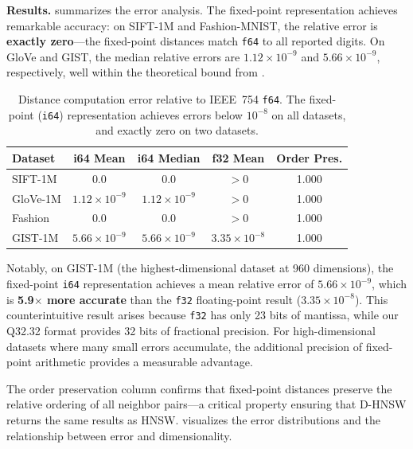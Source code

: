 \documentclass[10pt,journal,compsoc]{IEEEtran}
\newcommand{\dhnsw}{\textsc{D-HNSW}}
\newcommand{\hnsw}{\textsc{HNSW}}
\begin{document}
\textbf{Results.}  summarizes the error analysis. The fixed-point representation achieves remarkable accuracy: on SIFT-1M and Fashion-MNIST, the relative error is \textbf{exactly zero}---the fixed-point distances match \texttt{f64} to all reported digits. On GloVe and GIST, the median relative errors are $1.12 \times 10^{-9}$ and $5.66 \times 10^{-9}$, respectively, well within the theoretical bound from .

\begin{table}[t]
  \centering
  \caption{Distance computation error relative to IEEE~754 \texttt{f64}. The fixed-point (\texttt{i64}) representation achieves errors below $10^{-8}$ on all datasets, and exactly zero on two datasets.}
  \label{tab:error}
  \begin{tabular}{lcccc}
    \toprule
    \textbf{Dataset} & \textbf{i64 Mean} & \textbf{i64 Median} & \textbf{f32 Mean} & \textbf{Order Pres.} \\
    \midrule
    SIFT-1M  & 0.0             & 0.0             & $>0$           & 1.000 \\
    GloVe-1M & $1.12\times10^{-9}$ & $1.12\times10^{-9}$ & $>0$     & 1.000 \\
    Fashion  & 0.0             & 0.0             & $>0$           & 1.000 \\
    GIST-1M  & $5.66\times10^{-9}$ & $5.66\times10^{-9}$ & $3.35\times10^{-8}$ & 1.000 \\
    \bottomrule
  \end{tabular}
\end{table}

Notably, on GIST-1M (the highest-dimensional dataset at 960 dimensions), the fixed-point \texttt{i64} representation achieves a mean relative error of $5.66 \times 10^{-9}$, which is \textbf{5.9$\times$ more accurate} than the \texttt{f32} floating-point result ($3.35 \times 10^{-8}$). This counterintuitive result arises because \texttt{f32} has only 23 bits of mantissa, while our Q32.32 format provides 32 bits of fractional precision. For high-dimensional datasets where many small errors accumulate, the additional precision of fixed-point arithmetic provides a measurable advantage.

The order preservation column confirms that fixed-point distances preserve the relative ordering of all neighbor pairs---a critical property ensuring that \dhnsw{} returns the same results as \hnsw{}.  visualizes the error distributions and the relationship between error and dimensionality.
\end{document}

